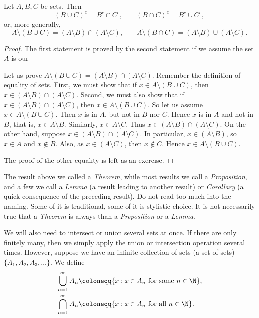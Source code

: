 \begin{thm}[DeMorgan]
Let $A, B, C$ be sets.  Then
\begin{equation*}
{(B \cup C)}^c = B^c \cap C^c , \qquad
{(B \cap C)}^c = B^c \cup C^c ,
\end{equation*}
or, more generally,
\begin{equation*}
A \setminus (B \cup C) = (A \setminus B) \cap (A \setminus C) , 
\qquad
A \setminus (B \cap C) = (A \setminus B) \cup (A \setminus C) .
\end{equation*}
\end{thm}

\begin{proof}
The first statement is proved by the second statement if we
assume the set $A$ is our 

Let us prove $A \setminus (B \cup C) = (A \setminus B) \cap (A \setminus C)$.
Remember the definition of equality of sets.  First, we must show that
if $x \in A \setminus (B \cup C)$, then
$x \in (A \setminus B) \cap (A \setminus C)$.  Second, we must also show that
if $x \in (A \setminus B) \cap (A \setminus C)$, then
$x \in A \setminus (B \cup C)$.
So let us assume $x \in A \setminus (B \cup C)$.  Then $x$ is in 
$A$, but not in $B$ nor $C$.  Hence $x$ is in $A$ and not in $B$, that is,
$x \in A \setminus B$.  Similarly, $x \in A \setminus C$.  Thus
$x \in (A \setminus B) \cap (A \setminus C)$.
On the other hand, suppose 
$x \in (A \setminus B) \cap (A \setminus C)$.  In particular,
$x \in (A \setminus B)$, so 
$x \in A$ and $x \notin B$.  Also, as $x \in (A \setminus C)$, then $x \notin C$.
Hence $x \in A \setminus (B \cup C)$.

The proof of the other equality is left as an exercise.
\end{proof}

The result above we called a \emph{Theorem}, while most results we call
a \emph{Proposition}, and a few we call a \emph{Lemma} (a result leading to another result) or
\emph{Corollary} (a quick consequence of the preceding result).
Do not read too much into
the naming.  Some of it is traditional, some of it is stylistic choice.
It is not necessarily true that a \emph{Theorem} is always
 than a
\emph{Proposition} or a \emph{Lemma}.

\medskip

We will also need to intersect or union several sets at once.  If there are
only finitely many, then we simply apply the union or intersection operation
several times.  However, suppose we have an infinite collection
of sets (a set of sets)
$\{ A_1, A_2, A_3, \ldots \}$.  We define
\begin{align*}
& \bigcup_{n=1}^\infty A_n \coloneqq \{ x : x \in A_n \text{ for some } n \in \N
\} , \\
& \bigcap_{n=1}^\infty A_n \coloneqq \{ x : x \in A_n \text{ for all } n \in \N
\} .
\end{align*}

